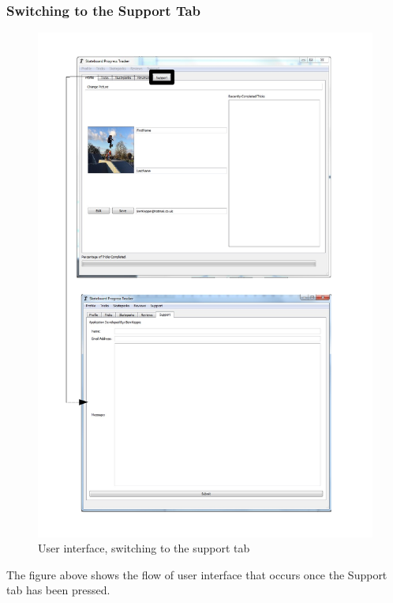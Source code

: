 \subsubsection{Switching to the Support Tab}
\begin{figure}[H]
    \includegraphics[width=\textwidth]{./Maintenance/Figures/SupportTab.pdf}
    \caption{User interface, switching to the support tab} \label{fig:Support Tab UI}
\end{figure}

The figure above shows the flow of user interface that occurs once the Support tab has been pressed.











